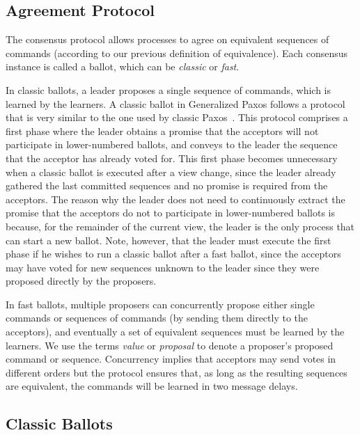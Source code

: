 \subsection{Agreement Protocol} 

The consensus protocol allows processes to agree on equivalent sequences of commands (according to our previous definition of equivalence). Each consensus instance is called a ballot, which can be \textit{classic} or \textit{fast}. 

In classic ballots, a leader proposes a single sequence of commands, which is learned by the learners. 
A classic ballot in Generalized Paxos follows a protocol that is very similar to the one used by classic Paxos~\cite{paxos}. This protocol comprises a first phase where the leader obtains a promise that the acceptors will not participate in lower-numbered ballots, and conveys to the leader the sequence that the acceptor has already voted for. This first phase becomes unnecessary when a classic ballot is executed after a view change, since the leader already gathered the last committed sequences and no promise is required from the acceptors. The reason why the leader does not need to continuously extract the promise that the acceptors do not to participate in lower-numbered ballots is because, for the remainder of the current view, the leader is the only process that can start a new ballot.  Note, however, that the leader must execute the first phase if he wishes to run a classic ballot after a fast ballot, since the acceptors may have voted for new sequences unknown to the leader since they were proposed directly by the proposers.

In fast ballots, multiple proposers can concurrently propose either single commands or sequences of commands (by sending them directly to the acceptors), and eventually a set of equivalent sequences must be learned by the learners. We use the terms \textit{value} or \textit{proposal}  to denote a proposer's proposed command or sequence. 
Concurrency implies that acceptors may send votes in different orders but the protocol ensures that, as long as the resulting sequences are equivalent, the commands will be learned in two message delays. 

\subsection{Classic Ballots} 

